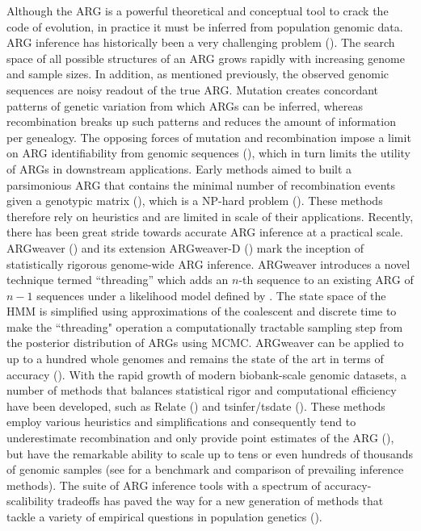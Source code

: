 Although the \ac{ARG} is a powerful theoretical and conceptual tool to crack the code of evolution, in practice it must be inferred from population genomic data. \ac{ARG} inference has historically been a very challenging problem (\cite{rasmussen_genome-wide_2014,mathieson_what_2020}). The search space of all possible structures of an \ac{ARG} grows rapidly with increasing genome and sample sizes. In addition, as mentioned previously, the observed genomic sequences are noisy readout of the true \ac{ARG}. Mutation creates concordant patterns of genetic variation from which \acp{ARG} can be inferred, whereas recombination breaks up such patterns and reduces the amount of information per genealogy. The opposing forces of mutation and recombination impose a limit on \ac{ARG} identifiability from genomic sequences (\cite{hubisz2020inference,hayman2023recoverability}), which in turn limits the utility of \acp{ARG} in downstream applications. Early methods aimed to built a parsimonious \ac{ARG} that contains the minimal number of recombination events given a genotypic matrix (\cite{wong2023general}), which is a NP-hard problem (\cite{wang2001perfect}). These methods therefore rely on heuristics and are limited in scale of their applications. Recently, there has been great stride towards accurate \ac{ARG} inference at a practical scale. ARGweaver (\cite{rasmussen_genome-wide_2014}) and its extension ARGweaver-D (\cite{hubisz_mapping_2020}) mark the inception of statistically rigorous genome-wide \ac{ARG} inference. ARGweaver introduces a novel technique termed “threading” which adds an $n$-th sequence to an existing \ac{ARG} of $n-1$ sequences under a likelihood model defined by . The state space of the \ac{HMM} is simplified using approximations of the coalescent and discrete time to make the ``threading" operation a computationally tractable sampling step from the posterior distribution of \acp{ARG} using \ac{MCMC}. ARGweaver can be applied to up to a hundred whole genomes and remains the state of the art in terms of accuracy (\cite{brandt2022evaluation}). With the rapid growth of modern biobank-scale genomic datasets, a number of methods that balances statistical rigor and computational efficiency have been developed, such as Relate (\cite{speidel_method_2019}) and tsinfer/tsdate (\cite{kelleher_inferring_2019,wohns_unified_nodate}). These methods employ various heuristics and simplifications and consequently tend to underestimate recombination and only provide point estimates of the \ac{ARG} (\cite{lewanski2023era,wong2023general}), but have the remarkable ability to scale up to tens or even hundreds of thousands of genomic samples (see \cite{brandt2022evaluation} for a benchmark and comparison of prevailing inference methods). The suite of \ac{ARG} inference tools with a spectrum of accuracy-scalibility tradeoffs has paved the way for a new generation of methods that tackle a variety of empirical questions in population genetics (\cite{stern_approximate_2019,stern_disentangling_2021,speidel_method_2019}).

